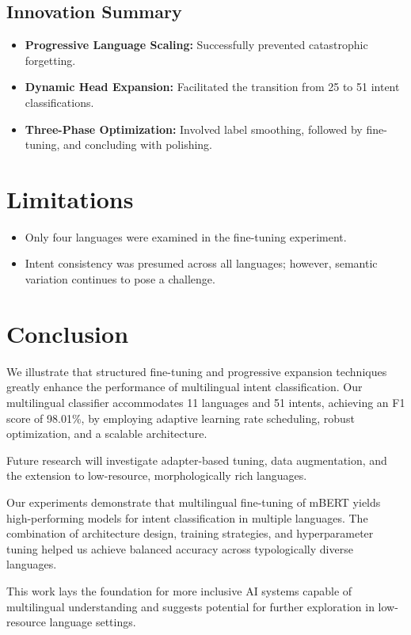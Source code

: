 \documentclass{ecai}
\begin{document}
\subsection{Innovation Summary}
\begin{itemize}
    \item \textbf{Progressive Language Scaling:} Successfully prevented catastrophic forgetting.
    \item \textbf{Dynamic Head Expansion:} Facilitated the transition from 25 to 51 intent classifications.
    \item \textbf{Three-Phase Optimization:} Involved label smoothing, followed by fine-tuning, and concluding with polishing.
\end{itemize}

\section{Limitations}
\begin{itemize}
    \item Only four languages were examined in the fine-tuning experiment.
    \item Intent consistency was presumed across all languages; however, semantic variation continues to pose a challenge.
\end{itemize}

\section{Conclusion}
We illustrate that structured fine-tuning and progressive expansion techniques greatly enhance the performance of multilingual intent classification. Our multilingual classifier accommodates 11 languages and 51 intents, achieving an F1 score of 98.01\%, by employing adaptive learning rate scheduling, robust optimization, and a scalable architecture.

Future research will investigate adapter-based tuning, data augmentation, and the extension to low-resource, morphologically rich languages.

Our experiments demonstrate that multilingual fine-tuning of mBERT yields high-performing models for intent classification in multiple languages. The combination of architecture design, training strategies, and hyperparameter tuning helped us achieve balanced accuracy across typologically diverse languages.

This work lays the foundation for more inclusive AI systems capable of multilingual understanding and suggests potential for further exploration in low-resource language settings.
\end{document}
